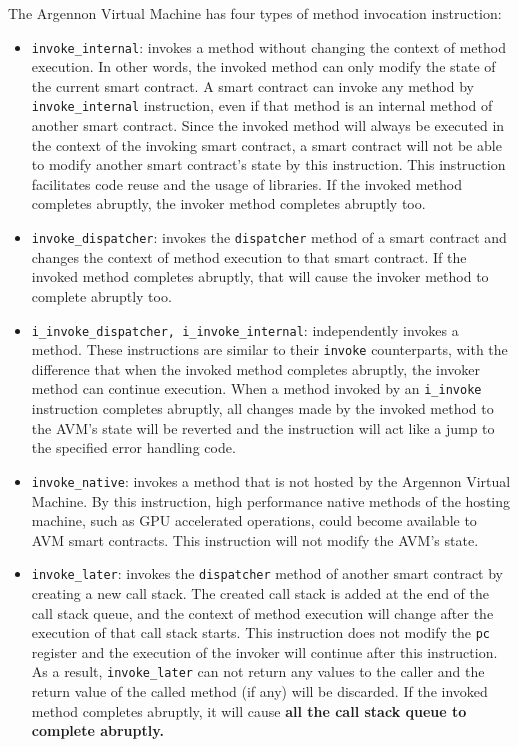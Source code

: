 The Argennon Virtual Machine has four types of method invocation instruction:
\begin{itemize}
    \item \texttt{invoke\_internal}: invokes a method without changing the context of method execution. In other
    words, the invoked method can only modify the state of the current smart contract.
    A smart contract can invoke any method by \texttt{invoke\_internal} instruction, even if that method is an
    internal method of another smart contract. Since the invoked method will always be executed in the context of
    the invoking smart contract, a smart contract will not be able to modify another smart contract's state by
    this instruction. This instruction facilitates code reuse and the usage of libraries.
    If the invoked method completes abruptly, the invoker method completes abruptly too.
    \item \texttt{invoke\_dispatcher}: invokes the \texttt{dispatcher} method of a smart contract and changes the
    context of method execution to that
    smart contract. If the invoked method completes abruptly, that will cause the invoker method to complete
    abruptly too.
    \item \texttt{i\_invoke\_dispatcher, i\_invoke\_internal}: independently invokes a method. These instructions
    are similar to their \texttt{invoke} counterparts, with the difference that when
    the invoked method completes abruptly, the invoker method can continue execution. When a method invoked by
    an \texttt{i\_invoke} instruction completes abruptly, all changes made
    by the invoked method to the AVM's state will be reverted and the instruction will act like
    a jump to the specified error handling code.
    \item \texttt{invoke\_native}: invokes a method that is not hosted by the Argennon Virtual Machine. By this
    instruction, high performance native methods of the hosting machine, such as GPU accelerated operations,
    could become available to AVM smart contracts. This instruction will not modify the AVM's state.
    \item \texttt{invoke\_later}: invokes the \texttt{dispatcher} method of another smart contract by creating a new
    call stack. The created call stack is added at the end of the call stack queue, and
    the context of method execution will change after the execution of that call stack starts. This instruction does
    not modify the \texttt{pc} register and the execution of the
    invoker will continue after this instruction. As a result, \texttt{invoke\_later} can not return
    any values to the caller and the return value of the called method (if any) will be discarded. If the invoked
    method completes abruptly, it will cause \textbf{all the call stack queue to
    complete abruptly.}
\end{itemize}

